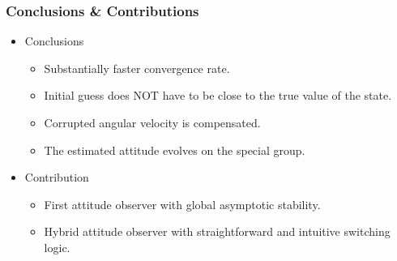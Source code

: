 \begin{frame} %
\frametitle{Conclusions \& Contributions}
\begin{itemize} 
\item Conclusions
	\begin{itemize} 
	\item Substantially faster convergence rate.
	\vspace*{0.15cm}
	\item Initial guess does NOT have to be close to the true value of the state. 	
	\vspace*{0.15cm} 
	\item Corrupted angular velocity is compensated.
	\vspace*{0.15cm}
	\item The estimated attitude evolves on the special group.
	\end{itemize} 
\vspace*{0.3cm}
\pause
\item Contribution
	\begin{itemize} 
	\item First attitude observer with global asymptotic stability.
	\vspace*{0.15cm} 
	\item Hybrid attitude observer with straightforward and intuitive switching logic.
	\end{itemize}  
\end{itemize} 
\vspace*{0.6cm}
\end{frame}   %


